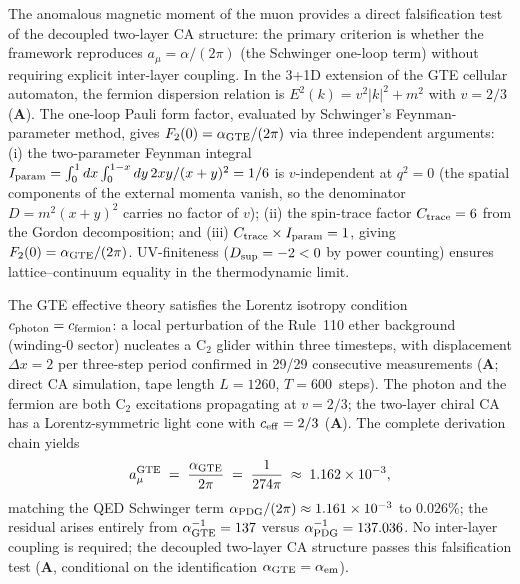 \documentclass[11pt]{article}
\theoremstyle{remark}
\newcommand{\CatA}{\textbf{A}}
\begin{document}
The anomalous magnetic moment of the muon provides a direct falsification test of the
decoupled two-layer CA structure: the primary criterion is whether the framework
reproduces $a_\mu = \alpha/(2\pi)$ (the Schwinger one-loop term) without requiring
explicit inter-layer coupling.
In the 3+1D extension of the GTE cellular automaton, the fermion dispersion relation is
$E^2(k) = v^2|k|^2 + m^2$ with $v = 2/3$ ($\CatA$).
The one-loop Pauli form factor, evaluated by Schwinger's Feynman-parameter method, gives
$F_2(0) = \alpha_{\rm GTE}/(2\pi)$ via three independent arguments:
(i) the two-parameter Feynman integral
$I_{\rm param} = \int_0^1 dx\int_0^{1-x} dy\,2xy/(x+y)^2 = 1/6$ is
$v$-independent at $q^2 = 0$ (the spatial components of the external momenta vanish,
so the denominator $D = m^2(x+y)^2$ carries no factor of $v$);
(ii) the spin-trace factor $C_{\rm trace} = 6$ from the Gordon decomposition; and
(iii) $C_{\rm trace} \times I_{\rm param} = 1$, giving $F_2(0) = \alpha_{\rm GTE}/(2\pi)$.
UV-finiteness ($D_{\rm sup} = -2 < 0$ by power counting) ensures lattice--continuum
equality in the thermodynamic limit.

The GTE effective theory satisfies the Lorentz isotropy condition
$c_{\rm photon} = c_{\rm fermion}$:
a local perturbation of the Rule~110 ether background (winding-0 sector) nucleates a
C$_2$ glider within three timesteps, with displacement $\Delta x = 2$ per three-step
period confirmed in 29/29 consecutive measurements ($\CatA$; direct CA simulation,
tape length $L = 1260$, $T = 600$~steps).
The photon and the fermion are both C$_2$ excitations propagating at $v = 2/3$;
the two-layer chiral CA has a Lorentz-symmetric light cone with $c_{\rm eff} = 2/3$ ($\CatA$).
The complete derivation chain yields
\begin{equation}
  a_\mu^{\rm GTE}
    \;=\; \frac{\alpha_{\rm GTE}}{2\pi}
    \;=\; \frac{1}{274\pi}
    \;\approx\; 1.162 \times 10^{-3},
\end{equation}
matching the QED Schwinger term $\alpha_{\rm PDG}/(2\pi) \approx 1.161 \times 10^{-3}$
to $0.026\%$; the residual arises entirely from $\alpha_{\rm GTE}^{-1} = 137$
versus $\alpha_{\rm PDG}^{-1} = 137.036$.
No inter-layer coupling is required; the decoupled two-layer CA structure passes this
falsification test ($\CatA$, conditional on the identification $\alpha_{\rm GTE} = \alpha_{\rm em}$).
\end{document}

